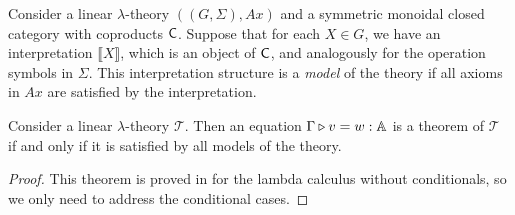 \begin{definition} 
Consider a linear \(\lambda\)-theory \(((G, \Sigma), Ax)\) and a symmetric monoidal closed category with coproducts \(\mathsf{C}\). 
Suppose that for each \(X \in G\), we have an interpretation \(\llbracket X \rrbracket\), which is an object of \(\mathsf{C}\), 
and analogously for the operation symbols in \(\Sigma\). 
This interpretation structure is a \emph{model} of the theory if all axioms in \(Ax\) are satisfied by the interpretation.
\end{definition}

\begin{theorem}[Completeness] \label{thm:completeness_classical}
Consider a linear $\lambda$-theory $\mathscr{T}$. Then an equation 
$\Gamma \triangleright v = w : \mathbb{A}$
is a theorem of $\mathscr{T}$ if and only if it is satisfied by all models of the theory.
\end{theorem}

 \begin{proof}
   This theorem is proved in \cite[Lemma 2.6]{dahlqvist2022syntactic} for the lambda calculus without conditionals, so we only need to address the conditional cases.
 \end{proof}


